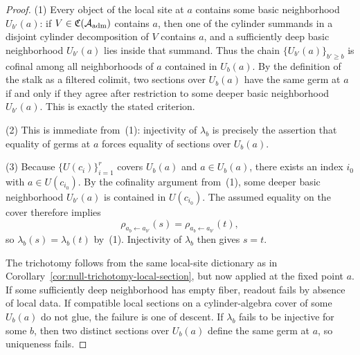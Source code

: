 \begin{proof}
\textup{(1)} Every object of the local site at $a$ contains some basic
neighborhood $U_{b'}(a)$: if $V\in\mathfrak{C}(\mathcal{A}_{\mathrm{adm}})$ contains $a$, then one of
the cylinder summands in a disjoint cylinder decomposition of $V$ contains $a$,
and a sufficiently deep basic neighborhood $U_{b'}(a)$ lies inside that
summand.  Thus the chain $\{U_{b'}(a)\}_{b'\ge b}$ is cofinal among all
neighborhoods of $a$ contained in $U_b(a)$.  By the definition of the stalk as
a filtered colimit, two sections over $U_b(a)$ have the same germ at $a$ if and
only if they agree after restriction to some deeper basic neighborhood
$U_{b'}(a)$.  This is exactly the stated criterion.

\textup{(2)} This is immediate from~\textup{(1)}: injectivity of $\lambda_b$ is
precisely the assertion that equality of germs at $a$ forces equality of
sections over $U_b(a)$.

\textup{(3)} Because $\{U(c_i)\}_{i=1}^r$ covers $U_b(a)$ and $a\in U_b(a)$,
there exists an index $i_0$ with $a\in U(c_{i_0})$.  By the cofinality argument
from~\textup{(1)}, some deeper basic neighborhood $U_{b'}(a)$ is contained in
$U(c_{i_0})$.  The assumed equality on the cover therefore implies
\[
\rho_{a_b\leftarrow a_{b'}}(s)=\rho_{a_b\leftarrow a_{b'}}(t),
\]
so $\lambda_b(s)=\lambda_b(t)$ by~\textup{(1)}.  Injectivity of $\lambda_b$
then gives $s=t$.

The trichotomy follows from the same local-site dictionary as in
Corollary~\ref{cor:null-trichotomy-local-section}, but now applied at the fixed
point $a$.  If some sufficiently deep neighborhood has empty fiber, readout
fails by absence of local data.  If compatible local sections on a
cylinder-algebra cover of some $U_b(a)$ do not glue, the failure is one of
descent.  If
$\lambda_b$ fails to be injective for some $b$, then two distinct sections over
$U_b(a)$ define the same germ at $a$, so uniqueness fails.
\end{proof}

